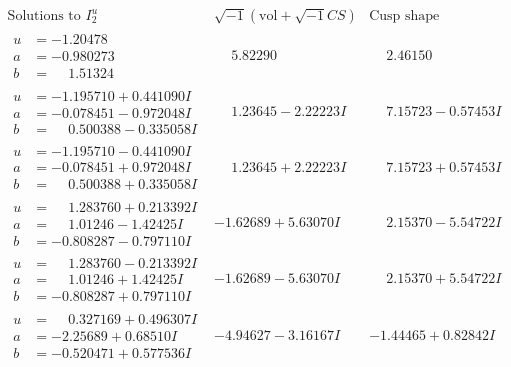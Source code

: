 \documentclass[1p]{elsarticle_modified}
\theoremstyle{definition}
\newcommand{\I}{\sqrt{-1}}
\begin{document}
$$\begin{array}{c|c|c}  
\text{Solutions to }I^u_{2}& \I (\text{vol} + \sqrt{-1}CS) & \text{Cusp shape}\\
 \hline 
\begin{aligned}
u &= -1.20478\phantom{ +0.000000I} \\
a &= -0.980273\phantom{ +0.000000I} \\
b &= \phantom{-}1.51324\phantom{ +0.000000I}\end{aligned}
 & \phantom{-}5.82290\phantom{ +0.000000I} & \phantom{-}2.46150\phantom{ +0.000000I} \\ \hline\begin{aligned}
u &= -1.195710 + 0.441090 I \\
a &= -0.078451 - 0.972048 I \\
b &= \phantom{-}0.500388 - 0.335058 I\end{aligned}
 & \phantom{-}1.23645 - 2.22223 I & \phantom{-}7.15723 - 0.57453 I \\ \hline\begin{aligned}
u &= -1.195710 - 0.441090 I \\
a &= -0.078451 + 0.972048 I \\
b &= \phantom{-}0.500388 + 0.335058 I\end{aligned}
 & \phantom{-}1.23645 + 2.22223 I & \phantom{-}7.15723 + 0.57453 I \\ \hline\begin{aligned}
u &= \phantom{-}1.283760 + 0.213392 I \\
a &= \phantom{-}1.01246 - 1.42425 I \\
b &= -0.808287 - 0.797110 I\end{aligned}
 & -1.62689 + 5.63070 I & \phantom{-}2.15370 - 5.54722 I \\ \hline\begin{aligned}
u &= \phantom{-}1.283760 - 0.213392 I \\
a &= \phantom{-}1.01246 + 1.42425 I \\
b &= -0.808287 + 0.797110 I\end{aligned}
 & -1.62689 - 5.63070 I & \phantom{-}2.15370 + 5.54722 I \\ \hline\begin{aligned}
u &= \phantom{-}0.327169 + 0.496307 I \\
a &= -2.25689 + 0.68510 I \\
b &= -0.520471 + 0.577536 I\end{aligned}
 & -4.94627 - 3.16167 I & -1.44465 + 0.82842 I \\ \hline\begin{aligned}

\end{aligned}
\end{array}$$
\end{document}
